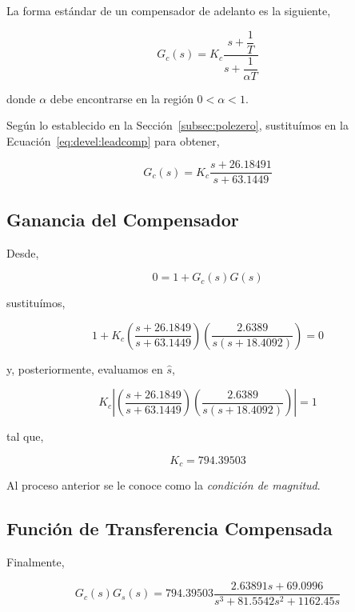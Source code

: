 \documentclass[12pt,a4paper]{article}
\begin{document}
    La forma estándar de un compensador de adelanto es la siguiente, 

    \begin{equation}  
      G_{c}\left(s\right) = K_{c}\dfrac{s+\dfrac{1}{T}}{s + \dfrac{1}{\alpha T}}
      \label{eq:devel:leadcomp}
    \end{equation}

    donde \( \alpha \) debe encontrarse en la región \( 0 < \alpha < 1 \). 

    Según lo establecido en la Sección~\ref{subsec:polezero}, sustituímos en la 
    Ecuación~\ref{eq:devel:leadcomp} para obtener, 

    \[ G_{c}\left(s\right) = K_{c}\dfrac{s + 26.18491}{s + 63.1449}\]
        
    \subsection{Ganancia del Compensador}

      Desde, 

      \begin{equation}
        0 = 1 + G_{c}\left(s\right)G\left(s\right)
        \label{eq:devel:compdsys_formula}
      \end{equation}

      sustituímos, 

      \[ 1 + K_{c}\left(\dfrac{s + 26.1849}{s + 63.1449}\right)\left(\dfrac{2.6389}{s\left(s + 18.4092\right)}\right) = 0 \]

      y, posteriormente, evaluamos en \( \hat{s} \), 

      \[ K_{c}\left|\left(\dfrac{s + 26.1849}{s + 63.1449}\right)\left(\dfrac{2.6389}{s\left(s + 18.4092\right)}\right)\right| = 1 \]

      tal que, 

      \[ K_{c} = 794.39503 \]

      Al proceso anterior se le conoce como la \emph{condición de magnitud}. 

    \subsection{Función de Transferencia Compensada} 

      Finalmente, 

      \begin{equation*}
        G_{c}\left(s\right)G_{s}\left(s\right) = 794.39503\frac{2.63891s + 69.0996}{s^{3} + 81.5542s^{2} + 1162.45s}
      \end{equation*}
\end{document}
